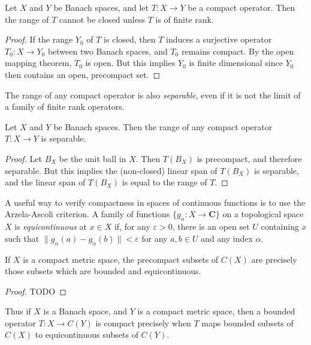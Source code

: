 \begin{lemma}
    Let $X$ and $Y$ be Banach spaces, and let $T: X \to Y$ be a compact operator. Then the range of $T$ cannot be closed unless $T$ is of finite rank.
\end{lemma}
\begin{proof}
    If the range $Y_0$ of $T$ is closed, then $T$ induces a surjective operator $T_0: X \to Y_0$ between two Banach spaces, and $T_0$ remains compact. By the open mapping theorem, $T_0$ is open. But this implies $Y_0$ is finite dimensional since $Y_0$ then contains an open, precompact set.
\end{proof}

The range of any compact operator is also \emph{separable}, even if it is not the limit of a family of finite rank operators.

\begin{lemma}
    Let $X$ and $Y$ be Banach spaces. Then the range of any compact operator $T: X \to Y$ is separable.
\end{lemma}
\begin{proof}
    Let $B_X$ be the unit ball in $X$. Then $T(B_X)$ is precompact, and therefore separable. But this implies the (non-closed) linear span of $T(B_X)$ is separable, and the linear span of $T(B_X)$ is equal to the range of $T$.
\end{proof}

A useful way to verify compactness in spaces of continuous functions is to use the Arzela-Ascoli criterion. A family of functions $\{ g_\alpha : X \to \mathbf{C} \}$ on a topological space $X$ is \emph{equicontinuous} at $x \in X$ if, for any $\varepsilon > 0$, there is an open set $U$ containing $x$ such that $\| g_\alpha(a) - g_\alpha(b) \| < \varepsilon$ for any $a,b \in U$ and any index $\alpha$.

\begin{theorem}
    If $X$ is a compact metric space, the precompact subsets of $C(X)$ are precisely those subsets which are bounded and equicontinuous.
\end{theorem}
\begin{proof}
    TODO
\end{proof}

Thus if $X$ is a Banach space, and $Y$ is a compact metric space, then a bounded operator $T: X \to C(Y)$ is compact precisely when $T$ maps bounded subsets of $C(X)$ to equicontinuous subsets of $C(Y)$.

